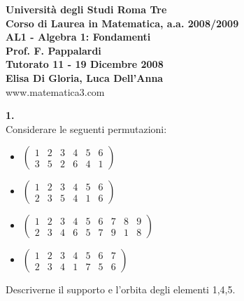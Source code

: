 \documentclass[italian,a4paper,11pt]
{article}
\begin{document}
\begin{center}


\textbf{Universit\`a degli Studi Roma Tre}\\

\textbf{Corso di Laurea in Matematica, a.a. 2008/2009}\\

\textbf{AL1 - Algebra 1: Fondamenti}\\

\textbf{Prof. F. Pappalardi}\\

\textbf{Tutorato 11 - 19 Dicembre 2008}\\

\textbf{Elisa Di Gloria, Luca Dell'Anna}\\

www.matematica3.com\\
\end{center}



\vspace{0.5cm}




\noindent
\begin{Ex}\textbf{ 1.}\\
Considerare le seguenti permutazioni:
\begin{itemize}
	\item $\left(\begin{matrix} 1 & 2 & 3 & 4 & 5 & 6 \\ 3 & 5 & 2 & 6 & 4 & 1 \end{matrix} \right )$
	\item $\left(\begin{matrix} 1 & 2 & 3 & 4 & 5 & 6 \\ 2 & 3 & 5 & 4 & 1 & 6 \end{matrix} \right )$
	\item $\left(\begin{matrix} 1 & 2 & 3 & 4 & 5 & 6 & 7 & 8 & 9 \\ 2 & 3 & 4 & 6 & 5 & 7 & 9 & 1 & 8 \end{matrix} \right )$
	\item $\left(\begin{matrix} 1 & 2 & 3 & 4 & 5 & 6 & 7 \\ 2 & 3 & 4 & 1 & 7 & 5 & 6 \end{matrix} \right )$
\end{itemize}
Descriverne il supporto e l'orbita degli elementi 1,4,5.
\end{Ex}
\end{document}
